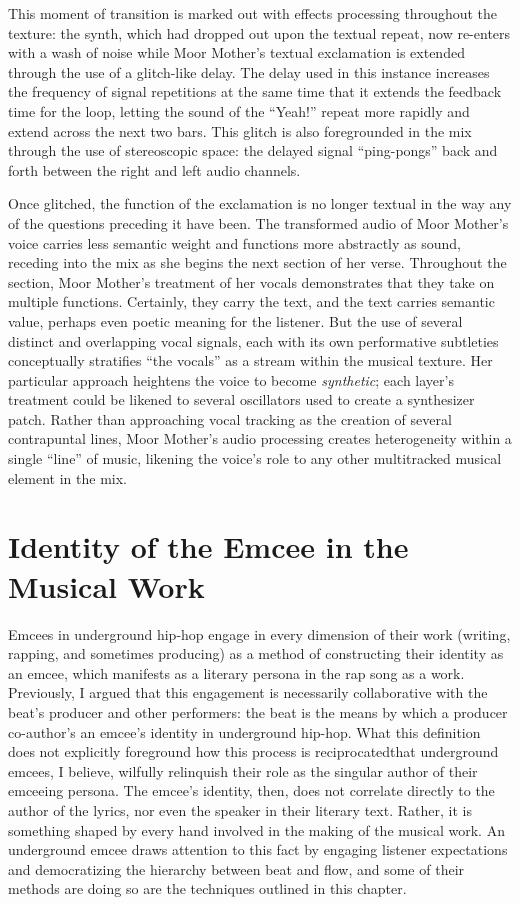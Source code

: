 This moment of transition is marked out with effects processing throughout the texture: the synth, which had dropped out
upon the textual repeat, now re-enters with a wash of noise while Moor Mother's textual exclamation is extended through
the use of a glitch-like delay. The delay used in this instance increases the frequency of signal repetitions at the same
time that it extends the feedback time for the loop, letting the sound of the ``Yeah!'' repeat more rapidly and extend
across the next two bars. This glitch is also foregrounded in the mix through the use of stereoscopic space: the delayed
signal ``ping-pongs'' back and forth between the right and left audio channels.

Once glitched, the function of the exclamation is no longer textual in the way any of the questions preceding it have been.
The transformed audio of Moor Mother's voice carries less semantic weight and functions more abstractly as sound, receding
into the mix as she begins the next section of her verse. Throughout the section, Moor Mother's treatment of her vocals
demonstrates that they take on multiple functions. Certainly, they carry the text, and the text carries semantic value, 
perhaps even poetic meaning for the listener. But the use of several distinct and overlapping vocal signals, each with its
own performative subtleties conceptually stratifies ``the vocals'' as a stream within the musical texture. Her particular
approach heightens the voice to become \emph{synthetic}; each layer's treatment could be likened to several oscillators used
to create a synthesizer patch. Rather than approaching vocal tracking as the creation of several contrapuntal lines, Moor
Mother's audio processing creates heterogeneity within a single ``line'' of music, likening the voice's role to any other
multitracked musical element in the mix.

\section{Identity of the Emcee in the Musical Work}
Emcees in underground hip-hop engage in every dimension of their work (writing, rapping, and sometimes producing) as
a  method of constructing their identity as an emcee, which manifests as a literary persona in the rap song as a work. 
Previously, I argued that this engagement is necessarily collaborative with the beat's producer and other performers: 
the beat is the means by which a producer co-author's an emcee's identity in underground hip-hop. What this definition 
does not explicitly foreground how this process is reciprocated\textemdash that underground emcees, I believe, wilfully 
relinquish their role as the singular author of their emceeing persona. The emcee's identity, then, does not correlate 
directly to the author of the lyrics, nor even the speaker in their literary text. Rather, it is something shaped by every
hand involved in the making of the musical work. An underground emcee draws attention to this fact by engaging listener 
expectations and democratizing the hierarchy between beat and flow, and some of their methods are doing so are the 
techniques outlined in this chapter.